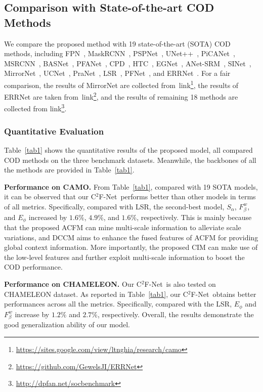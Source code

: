\documentclass[lettersize,journal]{IEEEtran}
\newcommand{\ourM}{{C$^2$F-Net}}
\begin{document}
\subsection{Comparison with State-of-the-art COD Methods}\label{comparison}

We compare the proposed method with 19 state-of-the-art (SOTA) COD methods, including FPN~\cite{fpn}, MaskRCNN~\cite{maskrcnn}, PSPNet~\cite{pspnet}, UNet++~\cite{unetplus}, PiCANet~\cite{picanet}, MSRCNN~\cite{masksrcnn}, BASNet~\cite{basnet}, PFANet~\cite{pfanet}, CPD~\cite{cpd}, HTC~\cite{htc}, EGNet~\cite{egnet}, ANet-SRM~\cite{anet}, SINet~\cite{sinet}, MirrorNet~\cite{mirrornet}, UCNet~\cite{ucnet}, PraNet~\cite{pranet}, LSR~\cite{lsr}, PFNet~\cite{pfnet}, and ERRNet~\cite{errnet}.
For a fair comparison, the results of MirrorNet are collected from~link\footnote{\url{https://sites.google.com/view/ltnghia/research/camo}}, the results of ERRNet are taken from~link\footnote{\url{https://github.com/GewelsJI/ERRNet}}, and the results of remaining 18 methods are collected from link\footnote{\url{http://dpfan.net/socbenchmark}}.

\subsubsection{Quantitative Evaluation}

Table~\ref{tab1} shows the quantitative results of the proposed model, all compared COD methods on the three benchmark datasets. Meanwhile, the backbones of all the methods are provided in Table~\ref{tab1}. 

\textbf{Performance on CAMO.} From Table~\ref{tab1}, compared with 19 SOTA models, it can be observed that our \ourM~performs better than other models in terms of all metrics. Specifically, compared with LSR, the second-best model, $S_\alpha$, $F_\beta^w$, and $E_\phi$ increased by $1.6\%$, $4.9\%$, and $1.6\%$, respectively. This is mainly because that the proposed ACFM can mine multi-scale information to alleviate scale variations, and DCCM aims to enhance the fused features of ACFM for providing global context information. More importantly, the proposed CIM can make use of the low-level features and further exploit multi-scale information to boost the COD performance. 

\textbf{Performance on CHAMELEON.} Our \ourM~is also tested on CHAMELEON \cite{sinet} dataset. As reported in Table~\ref{tab1}, our \ourM~obtains better performances across all the metrics. Specifically, compared with the LSR, $E_\phi$ and $F_\beta^w$ increase by $1.2\%$ and $2.7\%$, respectively. Overall, the results demonstrate the good generalization ability of our model. \par
\end{document}
